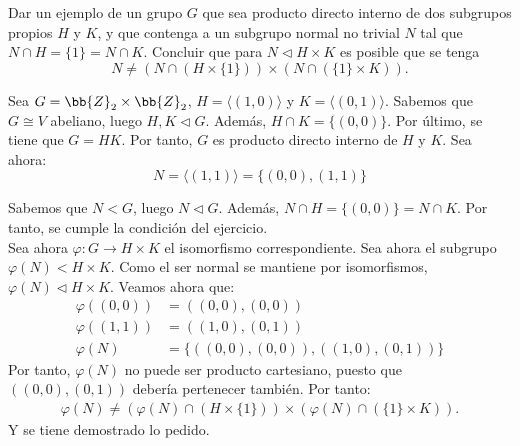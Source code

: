 \begin{ejercicio}
    Dar un ejemplo de un grupo $G$ que sea producto directo interno de dos subgrupos propios $H$ y $K$, y que contenga a un subgrupo normal no trivial $N$ tal que $N\cap H=\{1\}=N\cap K$. Concluir que para $N\lhd H\times K$ es posible que se tenga
    \[
        N\neq (N\cap (H\times \{1\}))\times (N\cap (\{1\}\times K)).
    \]

    Sea $G=\bb{Z}_2\times \bb{Z}_2$, $H=\langle(1,0)\rangle$ y $K=\langle(0,1)\rangle$.
    Sabemos que $G\cong V$ abeliano, luego $H,K\lhd G$. Además, $H\cap K=\{(0,0)\}$. Por último, se tiene que $G=HK$. Por tanto, $G$ es producto directo interno de $H$ y $K$. Sea ahora:
    \begin{equation*}
        N=\langle(1,1)\rangle = \{(0,0),(1,1)\}
    \end{equation*}

    Sabemos que $N<G$, luego $N\lhd G$. Además, $N\cap H=\{(0,0)\}=N\cap K$. Por tanto, se cumple la condición del ejercicio.\\

    Sea ahora $\varphi:G\to H\times K$ el isomorfismo correspondiente. Sea ahora el subgrupo $\varphi(N)<H\times K$. Como el ser normal se mantiene por isomorfismos, $\varphi(N)\lhd H\times K$. Veamos ahora que:
    \begin{align*}
        \varphi((0,0))&=((0,0),(0,0))\\
        \varphi((1,1))&=((1,0),(0,1))\\
        \varphi(N) &= \{((0,0),(0,0)),((1,0),(0,1))\}
    \end{align*}
    Por tanto, $\varphi(N)$ no puede ser producto cartesiano, puesto que $((0,0),(0,1))$ debería pertenecer también. Por tanto:
    \begin{align*}
        \varphi(N)\neq (\varphi(N)\cap (H\times \{1\}))\times (\varphi(N)\cap (\{1\}\times K)).
    \end{align*}
    Y se tiene demostrado lo pedido.
\end{ejercicio}

